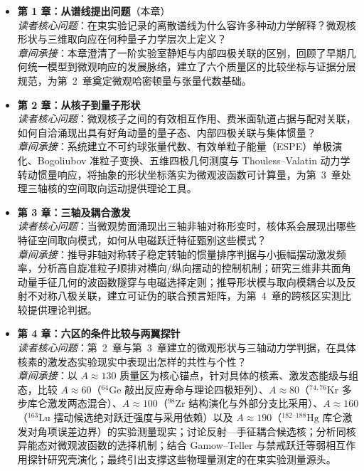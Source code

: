 \begin{itemize}
    \item \textbf{第 1 章：从谱线提出问题}（本章）\\
    \textit{读者核心问题}：在束实验记录的离散谱线为什么容许多种动力学解释？微观核形状与三维取向应在何种量子力学层次上定义？\\
    \textit{章间承接}：本章澄清了一阶实验室静矩与内部四极关联的区别，回顾了早期几何统一模型到微观响应的发展脉络，建立了六个质量区的比较坐标与证据分层规范，为第~2~章奠定微观哈密顿量与张量代数基础。

    \item \textbf{第 2 章：从核子到量子形状}\\
    \textit{读者核心问题}：微观核子之间的有效相互作用、费米面轨道占据与配对关联，如何自洽涌现出具有好角动量的量子态、内部四极关联与集体惯量？\\
    \textit{章间承接}：系统建立不可约球张量代数、有效单粒子能量（ESPE）单极演化、Bogoliubov 准粒子变换、五维四极几何测度与 Thouless--Valatin 动力学转动惯量响应，将抽象的形状坐标落实为微观波函数可计算量，为第~3~章处理三轴核的空间取向运动提供理论工具。

    \item \textbf{第 3 章：三轴及耦合激发}\\
    \textit{读者核心问题}：当微观势面涌现出三轴非轴对称形变时，核体系会展现出哪些特征空间取向模式，如何从电磁跃迁特征甄别这些模式？\\
    \textit{章间承接}：推导非轴对称转子稳定转轴的惯量排序判据与小振幅摆动激发频率，分析高自旋准粒子顺排对横向/纵向摆动的控制机制；研究三维非共面角动量手征几何的波函数隧穿与电磁选择定则；推导形状模与取向模耦合以及反射不对称八极关联，建立可证伪的联合预言矩阵，为第~4~章的跨核区实测比较提供理论判据。

    \item \textbf{第 4 章：六区的条件比较与两翼探针}\\
    \textit{读者核心问题}：第~2~章与第~3~章建立的微观形状与三轴动力学判据，在具体核素的激发态实验现实中表现出怎样的共性与个性？\\
    \textit{章间承接}：以 $A\approx 130$ 质量区为核心锚点，针对具体的核素、激发态能级与组态，比较 $A\approx 60$（$^{64}\mathrm{Ge}$ 敲出反应寿命与理论四极矩列）、$A\approx 80$（$^{74,76}\mathrm{Kr}$ 多步库仑激发两态混合）、$A\approx 100$（$^{98}\mathrm{Zr}$ 结构演化与外部分支比采用）、$A\approx 160$（$^{163}\mathrm{Lu}$ 摆动候选绝对跃迁强度与采用依赖）以及 $A\approx 190$（$^{182\text{--}188}\mathrm{Hg}$ 库仑激发对角项误差边界）的实验测量现实；讨论反射---手征耦合候选核；分析同核异能态对微观波函数的选择机制；结合 Gamow--Teller 与禁戒跃迁等弱相互作用探针研究壳演化；最终引出支撑这些物理量测定的在束实验测量源头。


\end{itemize}
